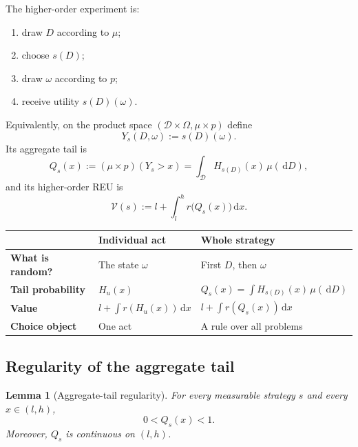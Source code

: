 \documentclass[11pt,a4paper]{article}
\newtheorem{lemma}[lemma]{Lemma}
\theoremstyle{definition}
\newcommand{\V}{\mathcal V}
\newcommand{\D}{\mathcal D}
\newcommand{\dd}{\,\mathrm d}
\begin{document}
The higher-order experiment is:
\begin{enumerate}
 \item draw $D$ according to $\mu$;
 \item choose $s(D)$;
 \item draw $\omega$ according to $p$;
 \item receive utility $s(D)(\omega)$.
\end{enumerate}
Equivalently, on the product space $(\D\times\Omega,\mu\times p)$ define
\[
 Y_s(D,\omega):=s(D)(\omega).
\]
Its aggregate tail is
\begin{equation}\label{eq:aggregate-tail}
 Q_s(x)
 :=(\mu\times p)(Y_s>x)
 =\int_\D H_{s(D)}(x)\,\mu(\dd D),
\end{equation}
and its higher-order REU is
\begin{equation}\label{eq:higher-value}
 \V(s)
 :=l+\int_l^h r\bigl(Q_s(x)\bigr)\dd x.
\end{equation}

\begin{center}
\renewcommand{\arraystretch}{1.25}
\begin{tabularx}{\textwidth}{>{\bfseries}p{}XX}
\toprule
 & Individual act & Whole strategy \\
\midrule
What is random? & The state $\omega$ & First $D$, then $\omega$ \\
Tail probability & $H_u(x)$ & $Q_s(x)=\int H_{s(D)}(x)\,\mu(\dd D)$ \\
Value & $l+\int r(H_u(x))\dd x$ & $l+\int r(Q_s(x))\dd x$ \\
Choice object & One act & A rule over all problems \\
\bottomrule
\end{tabularx}
\end{center}

\subsection{Regularity of the aggregate tail}

\begin{lemma}[Aggregate-tail regularity]\label{lem:aggregate-regularity}
For every measurable strategy $s$ and every $x\in(l,h)$,
\[
 0<Q_s(x)<1.
\]
Moreover, $Q_s$ is continuous on $(l,h)$.
\end{lemma}
\end{document}
